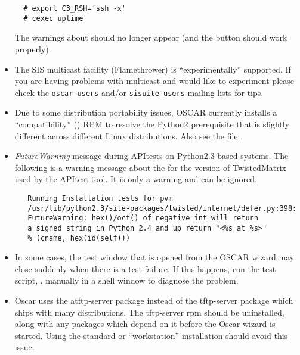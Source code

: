 \begin{itemize}
\begin{verbatim}
  # export C3_RSH='ssh -x'
  # cexec uptime
\end{verbatim}

  The warnings about  should no longer appear (and the
   button should work properly).

\item The SIS multicast facility (Flamethrower) is ``experimentally''
  supported.  If you are having problems with multicast and would like
  to experiment please check the {\tt oscar-users} and/or
  {\tt sisuite-users} mailing lists for tips.

\item Due to some distribution portability issues, OSCAR currently installs
  a ``compatibility''  () RPM to resolve the
  Python2 prerequisite that is slightly different across different Linux
  distributions.  Also see the file .

\item \emph{FutureWarning} message during APItests on Python2.3 based systems.
   The following is a warning message about the for the version of
   TwistedMatrix used by the APItest tool.  It is only a warning and can be
   ignored.
   \begin{small}
   \begin{verbatim}
   Running Installation tests for pvm
   /usr/lib/python2.3/site-packages/twisted/internet/defer.py:398:
   FutureWarning: hex()/oct() of negative int will return
   a signed string in Python 2.4 and up return "<%s at %s>" 
   % (cname, hex(id(self)))
   \end{verbatim}
   \end{small}

\item In some cases, the test window that is opened from the
  OSCAR wizard may close suddenly when there is a test failure. If
  this happens, run the test script, ,
  manually in a shell window to diagnose the problem.

\item Oscar uses the atftp-server package instead of the tftp-server
  package which ships with many distributions.  The tftp-server rpm
  should be uninstalled, along with any packages which depend on it
  before the Oscar wizard is started.  Using the standard or
  ``workstation'' installation should avoid this issue.


\end{itemize}
